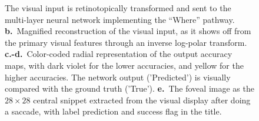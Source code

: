 \begin{figure}[t!]
{		The visual input is retinotopically transformed and sent to the multi-layer neural network implementing the ``Where'' pathway.
		{\bf b.}~Magnified reconstruction of the  visual input, as it shows off from the primary visual features through an inverse log-polar transform.
		{\bf c.-d.}~Color-coded radial representation of the output accuracy maps, with dark violet for the lower accuracies, and yellow for the higher accuracies. The network output ('Predicted') is visually compared with the ground truth ('True'). %
		{\bf e.}~The foveal image as the $28 \times 28$ central snippet extracted from the visual display after doing a saccade, with label prediction and success flag in the title.
		\label{fig:saccades}}%
\end{figure}%

